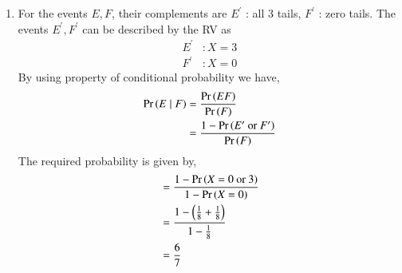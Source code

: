 \documentclass[journal,12pt,twocolumn]{IEEEtran}
\begin{document}
\begin{enumerate}
\begin{enumerate}
\item  For the events $E, F$, their complements are
$E^{\prime}$ : all 3 tails, $F^{\prime}$ : zero tails. The events $E^{\prime}, F^{\prime}$ can be described by the RV as
\begin{align}
E^{\prime} &: X = 3\\
F^{\prime} &: X = 0 
\end{align}
By using property of conditional probability we have,
\begin{align}
\Pr\left(E \mid F\right) &= \frac{\Pr\left(EF\right)}{\Pr\left(F\right)} \label{eq:1}\\
&= \frac{1 - \Pr\left(E^{\prime} \text{ or }F^{\prime}\right)}{\Pr\left(F\right)}
\end{align}
The required probability is given by,
\begin{align}
&= \frac{1 - \Pr\left(X = 0 \text{ or }3\right)}{1 - \Pr\left(X = 0\right)}\\
&= \frac{1 - \left(\frac{1}{8} + \frac{1}{8}\right)}{1-\frac{1}{8}}\\
&= \frac{6}{7}
\end{align}

\end{enumerate}
\end{enumerate}
\end{document}
